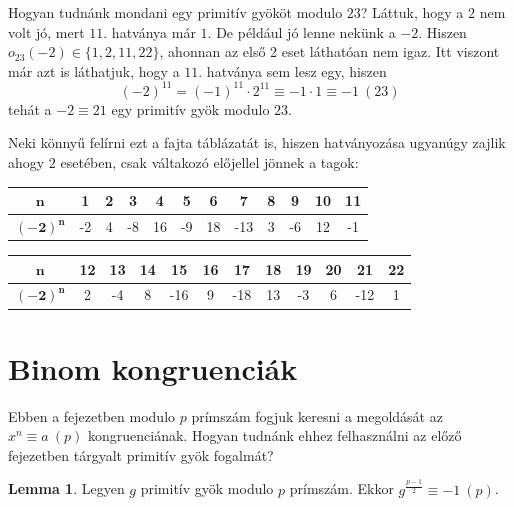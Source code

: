 \documentclass[12pt]{book}
\theoremstyle{plain} %
\theoremstyle{definition} %
\newtheorem{lem/}{Lemma}[section]
\newenvironment{lem}
  {\renewcommand{\qedsymbol}{$\clubsuit$}%
   \pushQED{\qed}\begin{lem/}}
  {\popQED\end{lem/}}
\theoremstyle{remark}
\renewcommand\qedsymbol{$\blacksquare$}
\numberwithin{equation}{section}  %
\begin{document}
	Hogyan tudnánk mondani egy primitív gyököt modulo $23$? Láttuk, hogy a $2$ nem volt jó, mert $11$. hatványa már $1$. De például jó lenne nekünk a $-2$. Hiszen $o_{23}(-2) \in \{ 1, 2, 11, 22  \}$, ahonnan az első 2 eset láthatóan nem igaz. Itt viszont már azt is láthatjuk, hogy a $11$. hatványa sem lesz egy, hiszen
	\[ (-2)^{11} = (-1)^{11} \cdot 2^{11} \equiv -1\cdot 1 \equiv -1\ (23)  \]
	tehát a $-2\equiv 21$ egy primitív gyök modulo $23$.
	
	Neki könnyű felírni ezt a fajta táblázatát is, hiszen hatványozása ugyanúgy zajlik ahogy $2$ esetében, csak váltakozó előjellel jönnek a tagok:
	\begin{center} \begin{large}
			\begin{tabular}{ | c | c | c | c | c | c | c | c | c | c | c | c | }
				\hline
				$\mathbf{n}$ & 1 & 2 & 3 & 4 & 5 & 6 & 7 & 8 & 9 & 10 & 11  \\ 
				\hline
				$\mathbf{(-2)^n}$ & -2 & 4 & -8 & 16 & -9 & 18 & -13 & 3 & -6 & 12 & -1 \\
				\hline   
			\end{tabular}
	\end{large} \end{center}

	\begin{center} \begin{large}
			\begin{tabular}{ | c | c | c | c | c | c | c | c | c | c | c | c | }
				\hline
				$\mathbf{n}$ & 12 & 13 & 14 & 15 & 16 & 17 & 18 & 19 & 20 & 21 & 22 \\ 
				\hline
				$\mathbf{(-2)^n}$ & 2 & -4 & 8 & -16 & 9 & -18 & 13 & -3 & 6 & -12 & 1 \\
				\hline   
			\end{tabular}
	\end{large} \end{center}
	
	\section{Binom kongruenciák}
	
	Ebben a fejezetben modulo $p$ prímszám fogjuk keresni a megoldását az $x^n \equiv a \ (p)$ kongruenciának. Hogyan tudnánk ehhez felhasználni az előző fejezetben tárgyalt primitív gyök fogalmát?
	
	\begin{lem}
		Legyen $g$ primitív gyök modulo $p$ prímszám. Ekkor $g^{\frac{p-1}{2}} \equiv -1\ (p)$.
	\end{lem}
\end{document}
